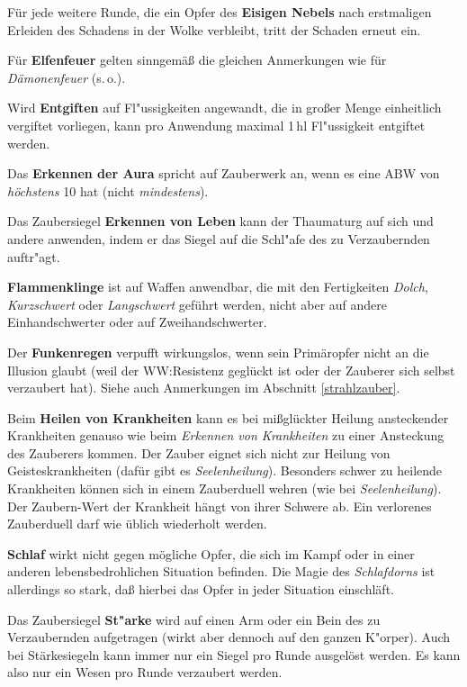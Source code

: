 \documentclass[10pt,a4paper,germanpar]{article}
\begin{document}
Für jede weitere Runde, die ein Opfer des \textbf{Eisigen Nebels} nach
erstmaligen Erleiden des Schadens in der Wolke verbleibt, tritt der
Schaden erneut ein.

Für \textbf{Elfenfeuer} gelten sinngemäß die gleichen Anmerkungen
wie für \emph{Dämonenfeuer} (s.\,o.).

Wird \textbf{Entgiften} auf Fl"ussigkeiten angewandt, die in großer
Menge einheitlich vergiftet vorliegen, kann pro Anwendung maximal
1\,hl Fl"ussigkeit entgiftet werden.

Das \textbf{Erkennen der Aura} spricht auf Zauberwerk an, wenn es eine ABW von
\emph{höchstens} 10 hat (nicht \emph{mindestens}).

Das Zaubersiegel \textbf{Erkennen von Leben} kann der Thaumaturg auf
sich und andere anwenden, indem er das Siegel auf die Schl"afe des zu
Verzaubernden auftr"agt.

\textbf{Flammenklinge} ist auf Waffen anwendbar, die mit den
Fertigkeiten \emph{Dolch}, \emph{Kurzschwert} oder \emph{Langschwert}
geführt werden, nicht aber auf andere Einhandschwerter oder auf
Zweihandschwerter.

Der \textbf{Funkenregen} verpufft wirkungslos, wenn sein Primäropfer
nicht an die Illusion glaubt (weil der WW:Resistenz geglückt ist oder
der Zauberer sich selbst verzaubert hat). Siehe auch Anmerkungen im
Abschnitt \ref{strahlzauber}.

Beim \textbf{Heilen von Krankheiten} kann es bei mißglückter Heilung
ansteckender Krankheiten genauso wie beim \emph{Erkennen von
  Krankheiten} zu einer Ansteckung des Zauberers kommen. Der Zauber
eignet sich nicht zur Heilung von Geisteskrankheiten (dafür gibt es
\emph{Seelenheilung}). Besonders schwer zu heilende Krankheiten können
sich in einem Zauberduell wehren (wie bei \emph{Seelenheilung}). Der
Zaubern-Wert der Krankheit hängt von ihrer Schwere ab. Ein verlorenes
Zauberduell darf wie üblich wiederholt werden.

\textbf{Schlaf} wirkt nicht gegen mögliche Opfer, die sich im Kampf
oder in einer anderen lebensbedrohlichen Situation befinden.
Die Magie des \emph{Schlafdorns} ist allerdings so stark, daß hierbei
das Opfer in jeder Situation einschläft.

Das Zaubersiegel \textbf{St"arke} wird auf einen Arm oder ein Bein des 
zu Verzaubernden aufgetragen (wirkt aber dennoch auf den ganzen
K"orper). Auch bei Stärkesiegeln kann immer nur ein Siegel pro Runde ausgelöst
werden. Es kann also nur ein Wesen pro Runde verzaubert werden.
\end{document}
